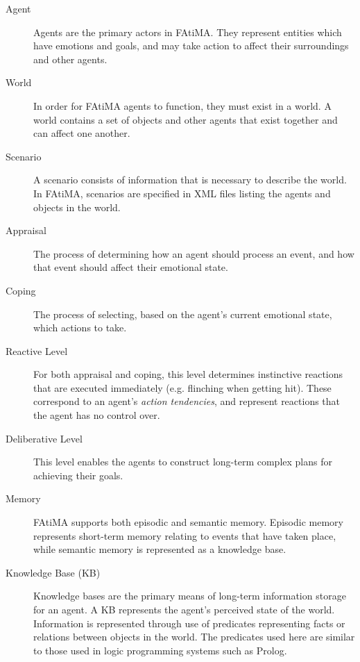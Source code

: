 \documentclass{article}
\begin{document}
\begin{description}

\item[Agent]
  Agents are the primary actors in FAtiMA.  They represent entities which have emotions
  and goals, and may take action to affect their surroundings and other agents.

\item[World]
  In order for FAtiMA agents to function, they must exist in a world.  A world contains
  a set of objects and other agents that exist together and can affect one another.

\item[Scenario]
  A scenario consists of information that is necessary to describe the world.  In
  FAtiMA, scenarios are specified in XML files listing the agents and objects
  in the world.

\item[Appraisal]
  The process of determining how an agent should process an event, and how that event should
  affect their emotional state.
  
\item[Coping]
  The process of selecting, based on the agent's current emotional state, which actions to
  take.

\item[Reactive Level]
  For both appraisal and coping, this level determines instinctive reactions that are
  executed immediately (e.g. flinching when getting hit).  These correspond to an
  agent's \emph{action tendencies}, and represent reactions that the agent has
  no control over.

\item[Deliberative Level]
  This level enables the agents to construct long-term complex plans for achieving
  their goals.

\item[Memory]
  FAtiMA supports both episodic and semantic memory.  Episodic memory represents 
  short-term memory relating to events that have taken place, while semantic
  memory is represented as a knowledge base.

\item[Knowledge Base (KB)]
  Knowledge bases are the primary means of long-term information storage for
  an agent.  A KB represents the agent's perceived state of the world.  Information
  is represented through use of predicates representing facts or relations
  between objects in the world.  The predicates used here are similar to those
  used in logic programming systems such as Prolog.


\end{description}
\end{document}

